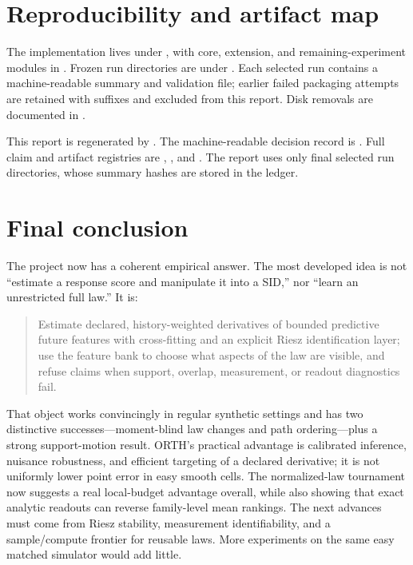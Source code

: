 \documentclass[11pt]{article}
\begin{document}
\section{Reproducibility and artifact map}

The implementation lives under , with core, extension, and remaining-experiment modules in .  Frozen run directories are under .  Each selected run contains a machine-readable summary and validation file; earlier failed packaging attempts are retained with suffixes and excluded from this report.  Disk removals are documented in .

This report is regenerated by .  The machine-readable decision record is .  Full claim and artifact registries are , , and .  The report uses only final selected run directories, whose summary hashes are stored in the ledger.

\section{Final conclusion}

The project now has a coherent empirical answer.  The most developed idea is not ``estimate a response score and manipulate it into a SID,'' nor ``learn an unrestricted full law.''  It is:
\begin{quote}
Estimate declared, history-weighted derivatives of bounded predictive future features with cross-fitting and an explicit Riesz identification layer; use the feature bank to choose what aspects of the law are visible, and refuse claims when support, overlap, measurement, or readout diagnostics fail.
\end{quote}
That object works convincingly in regular synthetic settings and has two distinctive successes---moment-blind law changes and path ordering---plus a strong support-motion result.  ORTH's practical advantage is calibrated inference, nuisance robustness, and efficient targeting of a declared derivative; it is not uniformly lower point error in easy smooth cells.  The normalized-law tournament now suggests a real local-budget advantage overall, while also showing that exact analytic readouts can reverse family-level mean rankings.  The next advances must come from Riesz stability, measurement identifiability, and a sample/compute frontier for reusable laws.  More experiments on the same easy matched simulator would add little.
\end{document}
